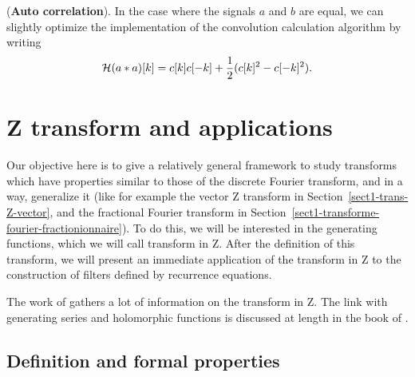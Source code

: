 \begin{rem}{(\upshape \textbf{Auto correlation}).} 
  In the case where the signals $ a $ and $ b $ are equal, we can slightly optimize the implementation of the convolution calculation algorithm by writing
\begin{equation*}
\mathcal{H} (a * a) [k] = c [k] c [-k] + \frac{1}{2} (c [k]^2 - c [-k]^2).
\end{equation*}
\end{rem}
 
\section{Z transform and applications}
\label{sect1-trans-Z} 
 
 
Our objective here is to give a relatively general framework to study transforms which have properties similar to those of the discrete Fourier transform, and in a way, generalize it (like for example the vector Z transform in Section~\ref{sect1-trans-Z-vector}, and the fractional Fourier transform in Section~\ref{sect1-transforme-fourier-fractionionnaire}). To do this, we will be interested in the generating functions, which we will call transform in Z. After the definition of this transform, we will present an immediate application of the transform in Z to the construction of filters defined by recurrence equations.
 
 
The work of  \cite{wich} gathers a lot of information on the transform in Z. The link with generating series and holomorphic functions is discussed at length in the book of  \cite{demengel}.
\subsection{Definition and formal properties}
\label{sect2-defn-trans-Z} 
 
